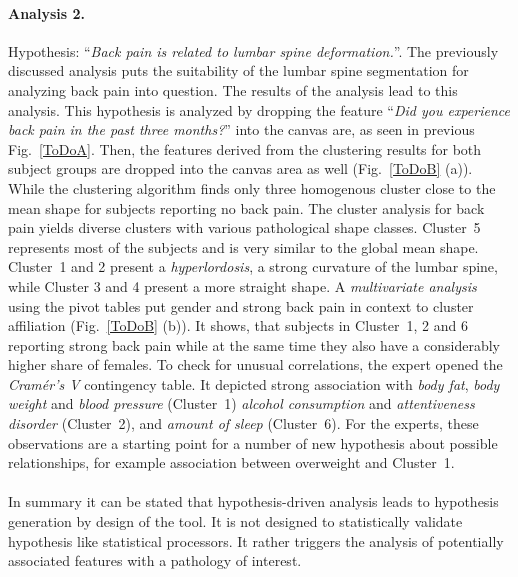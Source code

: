 \documentclass[journal]{style/vgtc} 			          %
\begin{document}
\paragraph{Analysis 2.}
Hypothesis: ``\emph{Back pain is related to lumbar spine deformation.}''.
%
The previously discussed analysis puts the suitability of the lumbar spine segmentation for analyzing back pain into question.
%
The results of the analysis lead to this analysis.
%
This hypothesis is analyzed by dropping the feature ``\emph{Did you experience back pain in the past three months?}'' into the canvas are, as seen in previous Fig.~\ref{ToDoA}.
%
Then, the features derived from the clustering results for both subject groups are dropped into the canvas area as well (Fig.~\ref{ToDoB} (a)).
%
While the clustering algorithm finds only three homogenous cluster close to the mean shape for subjects reporting no back pain.
%
The cluster analysis for back pain yields diverse clusters with various pathological shape classes.
%
Cluster~5 represents most of the subjects and is very similar to the global mean shape.
%
Cluster~1 and 2 present a \emph{hyperlordosis}, a strong curvature of the lumbar spine, while Cluster 3 and 4 present a more straight shape.
%
A \emph{multivariate analysis} using the pivot tables put gender and strong back pain in context to cluster affiliation (Fig.~\ref{ToDoB} (b)). 
%
It shows, that subjects in Cluster~1, 2 and 6 reporting strong back pain while at the same time they also have a considerably higher share of females.
%
To check for unusual correlations, the expert opened the \emph{Cram\'{e}r's V} contingency table.
%
It depicted strong association with \emph{body fat}, \emph{body weight} and \emph{blood pressure} (Cluster~1) \emph{alcohol consumption} and \emph{attentiveness disorder} (Cluster~2), and \emph{amount of sleep} (Cluster~6).
%
For the experts, these observations are a starting point for a number of new hypothesis about possible relationships, for example association between overweight and Cluster~1.
%
\\\\
In summary it can be stated that hypothesis-driven analysis leads to hypothesis generation by design of the tool.
%
It is not designed to statistically validate hypothesis like statistical processors.
%
It rather triggers the analysis of potentially associated features with a pathology of interest.
%
\end{document}

